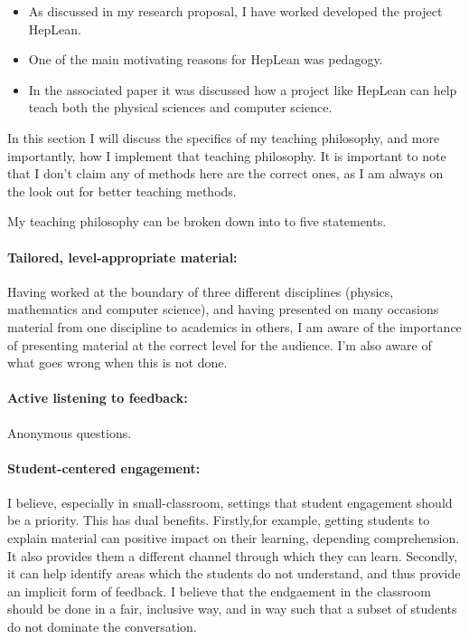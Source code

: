 \documentclass[14pt,letter]{article}
\newcounter{customtitle}
\begin{document}
\begin{itemize}
\item  As discussed in my research proposal, I have worked developed 
the project HepLean.
\item One of the main motivating reasons for HepLean was pedagogy. 
\item In the associated paper it was discussed how a project like HepLean can 
help teach both the physical sciences and computer science.
\end{itemize}
In this section I will discuss the specifics of my teaching philosophy, 
and more importantly, how I implement that teaching philosophy. 
It is important to note that I don't claim any of methods here are the correct 
ones, as I am always on the look out for better teaching methods.

My teaching philosophy can be broken down into to five statements.

\paragraph{Tailored, level-appropriate material:} Having worked at the boundary of 
three different disciplines (physics, mathematics and computer science), and having 
presented on many occasions material from one  discipline to academics in others, 
I am aware of the importance of presenting material at the correct level for the audience.
I'm also aware of what goes wrong when this is not done. 

\paragraph{Active listening to feedback:}  
 Anonymous questions.

\paragraph{Student-centered engagement:} I believe, especially in small-classroom,
settings that student engagement should be a priority. This has dual benefits. 
Firstly,for example, getting students to explain material can positive impact
on their learning, depending comprehension. It also provides them a different channel through which 
they can learn. Secondly, it can help identify areas which the students 
do not understand, and thus provide an implicit form of feedback. 
I believe that the endgaement in the classroom should be done in a fair, 
inclusive way, and in way such that a subset of students do not dominate 
the conversation.
\end{document}
